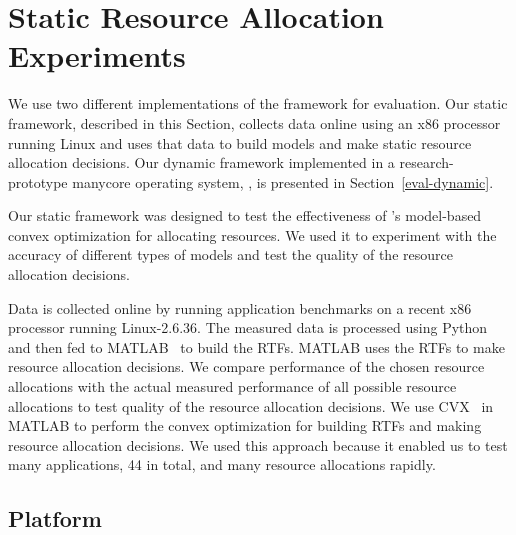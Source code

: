 \section{Static Resource Allocation Experiments}\label{eval-static}


We use two different implementations of the \pacora framework for evaluation. Our static framework, described in this Section, collects data online using an x86 processor running Linux and uses that data to build models and make static resource allocation decisions.  Our dynamic framework implemented in a research-prototype manycore operating system, \tess, is presented in Section~\ref{eval-dynamic}.

Our static framework was designed to test the effectiveness of \pacora's model-based convex optimization for allocating resources.  We used it to experiment with the accuracy of different types of models and test the quality of the resource allocation decisions.

Data is collected online by running application benchmarks on a recent x86 processor running Linux-2.6.36.  The measured data is processed using Python and then fed to MATLAB~\cite{matlab} to build the RTFs.  MATLAB uses the RTFs to make resource allocation decisions.  We compare performance of the chosen resource allocations with the actual measured performance of all possible resource allocations to test quality of the resource allocation decisions. We use CVX~\cite{cvx} in MATLAB to perform the convex optimization for building RTFs and making resource allocation decisions.  We used this approach because it enabled us to test many applications, 44 in total, and many resource allocations rapidly.

\subsection*{Platform}

